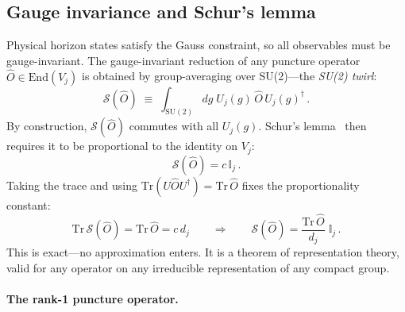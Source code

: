 \documentclass[aps,prd,twocolumn,10pt,superscriptaddress,nofootinbib]{revtex4-2}
\begin{document}
\subsection{Gauge invariance and Schur's lemma}
\label{sec:schur}

Physical horizon states satisfy the Gauss constraint, so all
observables must be gauge-invariant.  The gauge-invariant reduction
of any puncture operator
$\hat{O} \in \mathrm{End}(V_j)$ is obtained by group-averaging
over SU(2)---the \emph{SU(2) twirl}:
\begin{equation}
\mathcal{S}(\hat{O}) \;\equiv\;
  \int_{\mathrm{SU}(2)}\!dg\;
  U_j(g)\,\hat{O}\,U_j(g)^\dagger\,.
\label{eq:twirl_def}
\end{equation}
By construction, $\mathcal{S}(\hat{O})$ commutes with all
$U_j(g)$.  Schur's lemma~\cite{Hall2015} then requires it to be
proportional to the identity on $V_j$:
\begin{equation}
\mathcal{S}(\hat{O}) = c\,\mathbb{I}_j\,.
\label{eq:schur_prop}
\end{equation}
Taking the trace and using
$\mathrm{Tr}(U\hat{O}U^\dagger) = \mathrm{Tr}\,\hat{O}$ fixes
the proportionality constant:
\begin{equation}
\mathrm{Tr}\,\mathcal{S}(\hat{O})
  = \mathrm{Tr}\,\hat{O}
  = c\,d_j
\qquad\Longrightarrow\qquad
\boxed{\mathcal{S}(\hat{O})
  = \frac{\mathrm{Tr}\,\hat{O}}{d_j}\;\mathbb{I}_j\,.}
\label{eq:schur_exact}
\end{equation}
This is exact---no approximation enters.  It is a theorem of
representation theory, valid for any operator on any irreducible
representation of any compact group.

\paragraph{The rank-1 puncture operator.}
\end{document}
